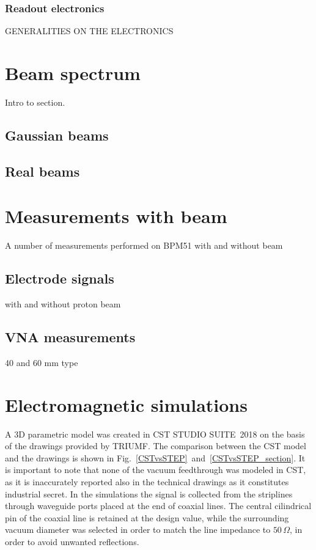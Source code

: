 \subsubsection{Readout electronics}

GENERALITIES ON THE ELECTRONICS


\section[Beam spectrum]{Beam spectrum}

Intro to section.

\subsection[Gaussian beams]{Gaussian beams}

\subsection[Real beams]{Real beams}


\section[Measurements with beam]{Measurements with beam}

A number of measurements performed on BPM51 with and without beam

\subsection[Electrode signals]{Electrode signals}

with and without proton beam

\subsection[VNA measurements]{VNA measurements}

40 and 60 mm type

\section[Electromagnetic simulations]{Electromagnetic simulations}

A 3D parametric model was created in CST STUDIO SUITE\textregistered~2018 on the basis of the drawings provided by TRIUMF. The comparison between the CST model and the drawings is shown in Fig.~\ref{CSTvsSTEP}~and~\ref{CSTvsSTEP_section}. It is important to note that none of the vacuum feedthrough was modeled in CST, as it is inaccurately reported also in the technical drawings as it constitutes industrial secret. In the simulations the signal is collected from the striplines through waveguide ports placed at the end of coaxial lines. The central cilindrical pin of the coaxial line is retained at the design value, while the surrounding vacuum diameter was selected in order to match the line impedance to $50\,\Omega$, in order to avoid unwanted reflections.

